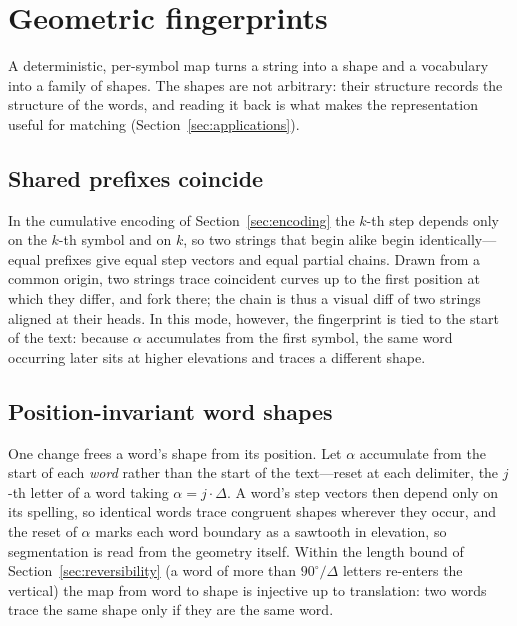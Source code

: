 \documentclass[11pt]{article}
\renewcommand{\deg}{^{\circ}}  %
\begin{document}
\section{Geometric fingerprints}\label{sec:fingerprints}

A deterministic, per-symbol map turns a string into a shape and a vocabulary into a family of
shapes. The shapes are not arbitrary: their structure records the structure of the words, and
reading it back is what makes the representation useful for matching
(Section~\ref{sec:applications}).

\subsection{Shared prefixes coincide}

In the cumulative encoding of Section~\ref{sec:encoding} the $k$-th step depends only on the
$k$-th symbol and on $k$, so two strings that begin alike begin identically---equal prefixes
give equal step vectors and equal partial chains. Drawn from a common origin, two strings
trace coincident curves up to the first position at which they differ, and fork there; the
chain is thus a visual diff of two strings aligned at their heads. In this mode, however, the
fingerprint is tied to the start of the text: because $\alpha$ accumulates from the first
symbol, the same word occurring later sits at higher elevations and traces a different shape.

\subsection{Position-invariant word shapes}

One change frees a word's shape from its position. Let $\alpha$ accumulate from the start of
each \emph{word} rather than the start of the text---reset at each delimiter, the $j$-th
letter of a word taking $\alpha=j\cdot\Delta$. A word's step vectors then depend only on its
spelling, so identical words trace congruent shapes wherever they occur, and the reset of
$\alpha$ marks each word boundary as a sawtooth in elevation, so segmentation is read from the
geometry itself. Within the length bound of Section~\ref{sec:reversibility} (a word of more
than $90\deg/\Delta$ letters re-enters the vertical) the map from word to shape is injective
up to translation: two words trace the same shape only if they are the same word.
\end{document}
